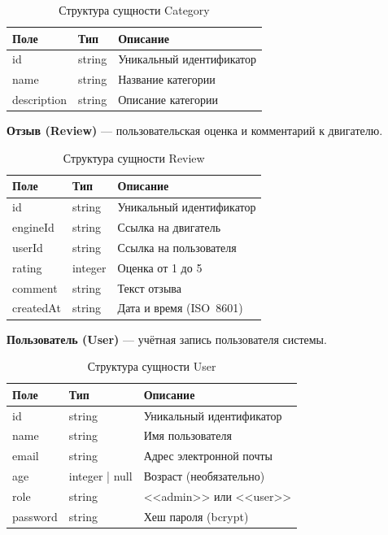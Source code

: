 \documentclass[14pt,a4paper]{extarticle}
\begin{document}
\begin{table}[h!]
\caption{Структура сущности Category}
\begin{tabular}{|p{3.5cm}|p{3.5cm}|p{7cm}|}
\hline
\textbf{Поле} & \textbf{Тип} & \textbf{Описание} \\
\hline
id          & string & Уникальный идентификатор \\
name        & string & Название категории \\
description & string & Описание категории \\
\hline
\end{tabular}
\end{table}

\textbf{Отзыв (Review)} --- пользовательская оценка и комментарий к двигателю.

\begin{table}[h!]
\caption{Структура сущности Review}
\begin{tabular}{|p{3.5cm}|p{3.5cm}|p{7cm}|}
\hline
\textbf{Поле} & \textbf{Тип} & \textbf{Описание} \\
\hline
id        & string  & Уникальный идентификатор \\
engineId  & string  & Ссылка на двигатель \\
userId    & string  & Ссылка на пользователя \\
rating    & integer & Оценка от 1 до 5 \\
comment   & string  & Текст отзыва \\
createdAt & string  & Дата и время (ISO~8601) \\
\hline
\end{tabular}
\end{table}

\textbf{Пользователь (User)} --- учётная запись пользователя системы.

\begin{table}[h!]
\caption{Структура сущности User}
\begin{tabular}{|p{3.5cm}|p{3.5cm}|p{7cm}|}
\hline
\textbf{Поле} & \textbf{Тип} & \textbf{Описание} \\
\hline
id       & string         & Уникальный идентификатор \\
name     & string         & Имя пользователя \\
email    & string         & Адрес электронной почты \\
age      & integer | null & Возраст (необязательно) \\
role     & string         & <<admin>> или <<user>> \\
password & string         & Хеш пароля (bcrypt) \\
\hline
\end{tabular}
\end{table}
\end{document}
